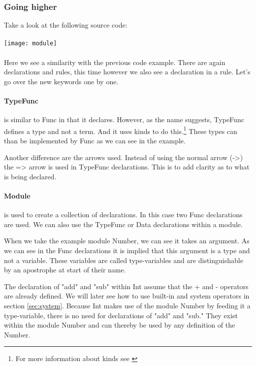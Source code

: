 \subsubsection{Going higher}
Take a look at the following source code:

\paragraph{}
\texttt{[image: module]}

\paragraph{}
Here we see a similarity with the previous code example.
There are again declarations and rules, this time however we also see a declaration in a rule.
Let's go over the new keywords one by one.

\paragraph{TypeFunc}
is similar to Func in that it declares.
However, as the name suggests, TypeFunc defines a type and not a term.
And it uses kinds to do this.\footnote{For more information about kinds see \cite{pierce2002types}}
These types can than be implemented by Func as we can see in the example.

Another difference are the arrows used.
Instead of using the normal arrow (->) the => arrow is used in TypeFunc declarations.
This is to add clarity as to what is being declared.

\paragraph{Module}
is used to create a collection of declarations.
In this case two Func declarations are used.
We can also use the TypeFunc or Data declarations within a module.

When we take the example module Number, we can see it takes an argument.
As we can see in the Func declarations it is implied that this argument is a type and not a variable.
These variables are called type-variables and are distinguishable by an apostrophe at start of their name.

The declaration of "add" and "sub" within Int assume that the + and - operators are already defined.
We will later see how to use built-in and system operators in section \ref{sec:system}.
Because Int makes use of the module Number by feeding it a type-variable, there is no need for declarations of "add" and "sub."
They exist within the module Number and can thereby be used by any definition of the Number.





